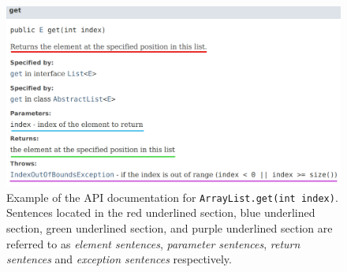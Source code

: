 \begin{figure}[h]
	\label{fig:api-doc-eg}
	\centering
	\includegraphics[width=\textwidth]{figs/api-doc-eg-highlight.png}
	\caption{Example of the API documentation for \lstinline{ArrayList.get(int index)}. Sentences located in the red underlined section, blue underlined section, green underlined section, and purple underlined section are referred to as \textit{element sentences}, \textit{parameter sentences}, \textit{return sentences} and \textit{exception sentences} respectively.}
\end{figure}

